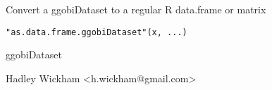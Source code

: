 \begin{Description}\relax
Convert a ggobiDataset to a regular R data.frame or matrix
\end{Description}
\begin{Usage}
\begin{verbatim}"as.data.frame.ggobiDataset"(x, ...)\end{verbatim}
\end{Usage}
\begin{Arguments}
\begin{ldescription}
\item[\code{x}] ggobiDataset
\item[\code{...}] 
\end{ldescription}
\end{Arguments}
\begin{Details}\relax
\end{Details}
\begin{Author}\relax
Hadley Wickham <h.wickham@gmail.com>
\end{Author}
\begin{Examples}
\begin{ExampleCode}\end{ExampleCode}
\end{Examples}

